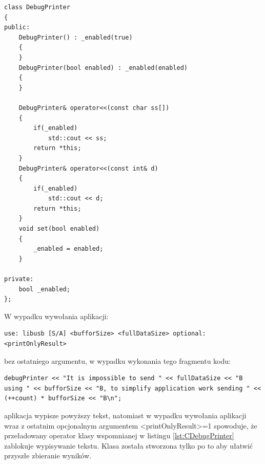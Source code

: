 \documentclass{BscUS}
\begin{document}
\begin{lstlisting}[caption={Klasa DebugPrinter},label={lst:CDebugPrinter}]
class DebugPrinter
{
public:
	DebugPrinter() : _enabled(true)
	{
	}
	DebugPrinter(bool enabled) : _enabled(enabled)
	{
	}
	
	DebugPrinter& operator<<(const char ss[])
	{
		if(_enabled)
			std::cout << ss;
		return *this;
	}
	DebugPrinter& operator<<(const int& d)
	{
		if(_enabled)
			std::cout << d;
		return *this;
	}
	void set(bool enabled)
	{
		_enabled = enabled;
	}

private:
	bool _enabled;
};
\end{lstlisting}
W wypadku wywołania aplikacji:
\begin{lstlisting}[caption={Uruchomienie testu}]
use: libusb [S/A] <bufforSize> <fullDataSize> optional:<printOnlyResult>
\end{lstlisting}
bez ostatniego argumentu, w wypadku wykonania tego fragmentu kodu: 
\begin{lstlisting}[caption={Wypisywanie w zależności od argumentu wywołania aplikacji}]
debugPrinter << "It is impossible to send " << fullDataSize << "B using " << bufforSize << "B, to simplify application work sending " << (++count) * bufforSize << "B\n";
\end{lstlisting}
aplikacja wypisze powyższy tekst, natomiast w wypadku wywołania aplikacji wraz z ostatnim opcjonalnym argumentem <printOnlyResult>=1 spowoduje, że przeładowany operator klasy wspomnianej w listingu \ref{lst:CDebugPrinter} zablokuje wypisywanie tekstu.
Klasa została stworzona tylko po to aby ułatwić przyszłe zbieranie wyników.
\end{document}
